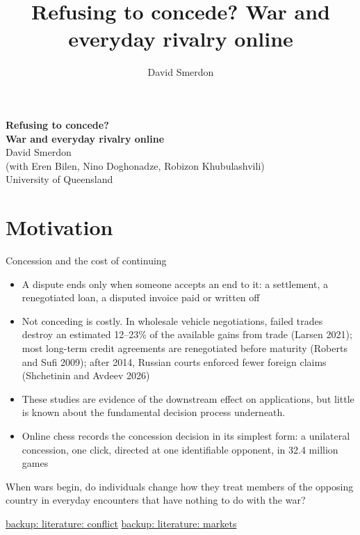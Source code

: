 \documentclass[aspectratio=169,11pt,t]{beamer}
\title{Refusing to concede? War and everyday rivalry online}
\author{David Smerdon}
\institute{University of Queensland}
\newcommand{\bk}[2]{\hyperlink{#1}{\textcolor{linkblue}{\scriptsize\textsf{backup: #2}}}}
\newcommand{\links}[1]{\vfill\hfill{#1}}
\begin{document}
\begin{frame}[plain]
  \vspace{16mm}
  \begin{center}
    {\LARGE\bfseries Refusing to concede?}\\[2mm]
    {\Large\bfseries War and everyday rivalry online}\\[14mm]
    {\large David Smerdon}\\[5mm]
    {\normalsize (with Eren Bilen, Nino Doghonadze, Robizon Khubulashvili)}\\[2mm]
    {\normalsize University of Queensland}
  \end{center}
\end{frame}

\section{Motivation}

\begin{frame}[label=motivation]{Concession and the cost of continuing}
  \footnotesize
  \begin{itemize}
    \item A dispute ends only when someone accepts an end to it: a settlement, a renegotiated loan, a disputed invoice paid or written off
    \item Not conceding is costly. In wholesale vehicle negotiations, failed trades destroy an estimated 12--23\% of the available gains from trade (Larsen 2021); most long-term credit agreements are renegotiated before maturity (Roberts and Sufi 2009); after 2014, Russian courts enforced fewer foreign claims (Shchetinin and Avdeev 2026)
    \item These studies are evidence of the downstream effect on applications, but little is known about the fundamental decision process underneath.     \item Online chess records the concession decision in its simplest form: a unilateral concession, one click, directed at one identifiable opponent, in 32.4 million games
  \end{itemize}
  \small
  \begin{block}{}
    \centering
    When wars begin, do individuals change how they treat members of the opposing country in everyday encounters that have nothing to do with the war?
  \end{block}
  \links{\bk{bk-lit1}{literature: conflict} \quad \bk{bk-lit2}{literature: markets}}
\end{frame}
\end{document}
